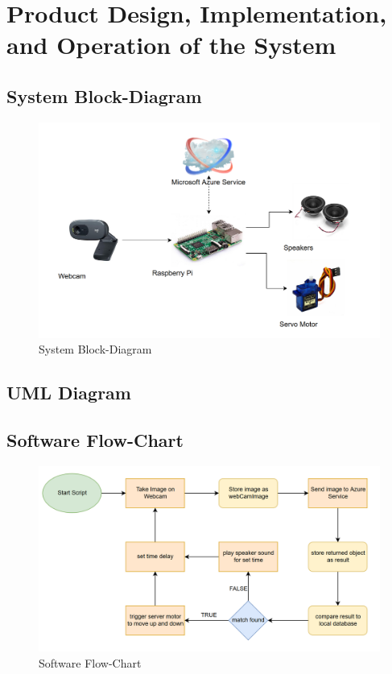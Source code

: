 \documentclass[a4paper,12pt]{article}
\begin{document}
\newpage
\section{Product Design, Implementation, and Operation of the System}
\subsection{System Block-Diagram}
\begin{figure}[h]
    \centering
    \includegraphics[width = \linewidth]{../images/BlockDiagram.png}
    \caption{System Block-Diagram}
\end{figure}

\newpage
\subsection{UML Diagram}

\newpage
\subsection{Software Flow-Chart}
\begin{figure}[h]
    \centering
    \includegraphics[width = \linewidth]{../images/FlowChart.png}
    \caption{Software Flow-Chart}
\end{figure}
\end{document}
